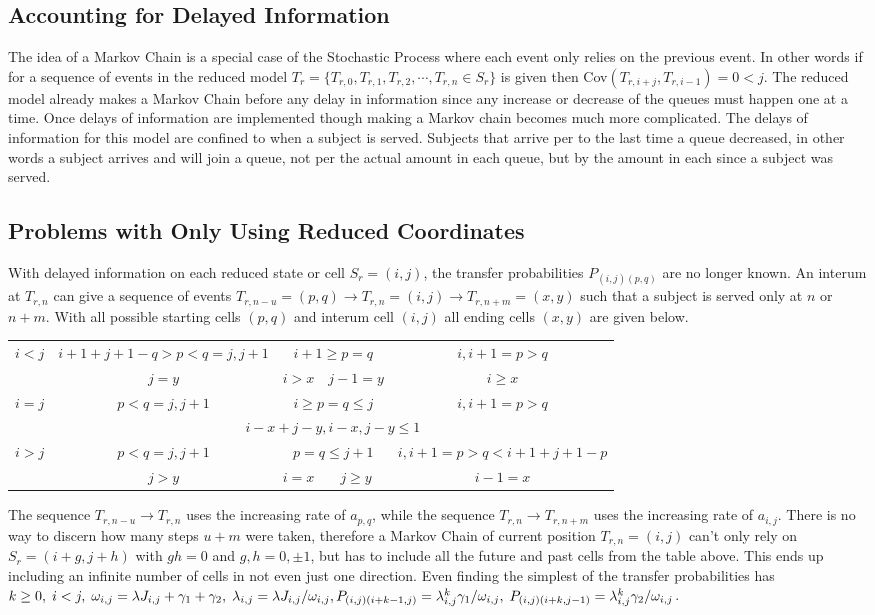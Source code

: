 \documentclass[12pt]{article}\usepackage{indentfirst}\usepackage[margin=2cm]{geometry}
\begin{document}
		\subsection{Accounting for Delayed Information}
		The idea of a Markov Chain is a special case of the Stochastic Process where each event only relies on the previous event.  In other words if for a sequence of events in the reduced model $T_r=\{T_{r,0},T_{r,1},T_{r,2},\cdots,T_{r,n}\in S_r\} $ is given then Cov$(T_{r,i+j},T_{r,i-1})=0<j$.  The reduced model already makes a Markov Chain before any delay in information since any increase or decrease of the queues must happen one at a time.  Once delays of information are implemented though making a Markov chain becomes much more complicated.  The delays of information for this model are confined to when a subject is served.  Subjects that arrive per to the last time a queue decreased, in other words a subject arrives and will join a queue, not per the actual amount in each queue, but by the amount in each since a subject was served.
		\subsection{Problems with Only Using Reduced Coordinates}
		With delayed information on each reduced state or cell $S_r=(i,j)$, the transfer probabilities $P_{(i,j)(p,q)}$ are no longer known.  An interum at $T_{r,n}$ can give a sequence of events $T_{r,n-u}=(p,q)\to T_{r,n}=(i,j)\to T_{r,n+m}=(x,y)$ such that a subject is served only at $n$ or $n+m$.  With all possible starting cells $(p,q)$ and interum cell $(i,j)$ all ending cells $(x,y)$ are given below.
		\begin{tabular}{c|cc|cc}
			\hline$i<j$&$i+1+j+1-q>p<q=j,j+1$&\multicolumn{2}{|c|}{$i+1\geq p=q$}&$i,i+1=p>q$
			\\&\multicolumn{1}{c}{$j=y$}&$i>x$&\multicolumn{1}{|c}{$j-1=y$}&$i\geq x$
			\\\hline$i=j$&$p<q=j,j+1$&\multicolumn{2}{|c|}{$i\geq p=q\leq j$}&$i,i+1=p>q$
			\\&\multicolumn{4}{c}{$i-x+j-y,i-x,j-y\leq 1$}
			\\\hline$i>j$&$p<q=j,j+1$&\multicolumn{2}{|c|}{$p=q\leq j+1$}&$i,i+1=p>q<i+1+j+1-p$
			\\&\multicolumn{1}{c}{$j>y$}&$i=x$&\multicolumn{1}{c}{$j\geq y$}&$i-1=x$
			\\\hline\end{tabular}
		The sequence $T_{r,n-u}\to T_{r,n}$ uses the increasing rate of $a_{p,q}$, while the sequence $T_{r,n}\to T_{r,n+m}$ uses the increasing rate of $a_{i,j}$.  There is no way to discern how many steps $u+m$ were taken, therefore a Markov Chain of current position $T_{r,n}=(i,j)$ can't only rely on $S_r=(i+g,j+h)$ with $gh=0$ and $g,h=0,\pm1$, but has to include all the future and past cells from the table above.  This ends up including an infinite number of cells in not even just one direction.  Even finding the simplest of the transfer probabilities has $k\geq0,\;i<j,\;\omega_{i,j}=\lambda J_{i,j}+\gamma_1+\gamma_2,\;\lambda_{i,j}=\lambda J_{i,j}/\omega_{i,j},\\P_{(i,j)(i+k-1,j)}=\lambda_{i,j}^k\gamma_1/\omega_{i,j},\;P_{(i,j)(i+k,j-1)}=\lambda_{i,j}^k\gamma_2/\omega_{i,j}$.
\end{document}
